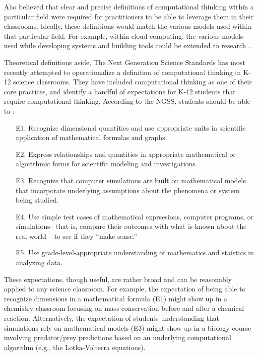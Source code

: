\documentclass{msuphddissertation}
\begin{document}
\begin{doublespace}
Aho believed that clear and precise definitions of computational thinking within a particular field were required for practitioners to be able to leverage them in their classrooms.  Ideally, these definitions would match the various models used within that particular field.  For example, within cloud computing, the various models used while developing systems and building tools could be extended to research \cite{Aho2012}.

Theoretical definitions aside, The Next Generation Science Standards has most recently attempted to operationalize a definition of computational thinking in K-12 science classrooms.  They have included computational thinking as one of their core practices, and identify a handful of expectations for K-12 students that require computational thinking.  According to the NGSS, students should be able to \cite{NGSS2012}: \begin{enumerate}
\item[E1.] Recognize dimensional quantities and use appropriate units in scientific application of mathematical formulas and graphs.

\item[E2.] Express relationships and quantities in appropriate mathematical or algorithmic forms for scientific modeling and investigations.

\item[E3.] Recognize that computer simulations are built on mathematical models that incorporate underlying assumptions about the phenomena or system being studied.

\item[E4.] Use simple test cases of mathematical exprsesions, computer programs, or simulations-- that is, compare their outcomes with what is known about the real world -- to see if they ``make sense.''

\item[E5.] Use grade-level-appropriate understanding of mathematics and staistics in analyzing data.
\end{enumerate}

These expectations, though useful, are rather broad and can be reasonably applied to any science classroom.  For example, the expectation of being able to recognize dimensions in a mathematical formula (E1) might show up in a chemistry classroom focusing on mass conservation before and after a chemical reaction.  Alternatively, the expectation of students understanding that simulations rely on mathematical models (E3) might show up in a biology course involving predator/prey predictions based on an underlying computational algorithm (e.g., the Lotka-Volterra equations). 


\end{doublespace}
\end{document}
